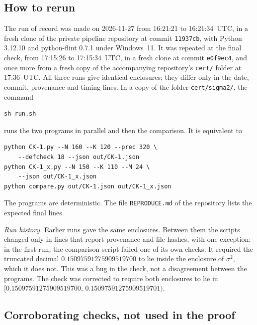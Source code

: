 \documentclass[11pt]{amsart}
\theoremstyle{definition}
\theoremstyle{remark}
\numberwithin{equation}{section}
\begin{document}
\subsection{How to rerun}

The run of record was made on 2026-11-27 from 16:21:21 to 16:21:34~UTC, in a fresh clone of the private pipeline repository at commit \texttt{11937cb}, with Python 3.12.10 and python-flint 0.7.1 under Windows~11. It was repeated at the final check, from 17:15:26 to 17:15:34~UTC, in a fresh clone at commit \texttt{e0f9ec4}, and once more from a fresh copy of the accompanying repository's \nolinkurl{cert/} folder at 17:36~UTC. All three runs give identical enclosures; they differ only in the date, commit, provenance and timing lines. In a copy of the folder \nolinkurl{cert/sigma2/}, the command
\begin{verbatim}
sh run.sh
\end{verbatim}
runs the two programs in parallel and then the comparison. It is equivalent to
\begin{verbatim}
python CK-1.py --N 160 --K 120 --prec 320 \
    --defcheck 18 --json out/CK-1.json
python CK-1_x.py --N 150 --K 110 --M 24 \
    --json out/CK-1_x.json
python compare.py out/CK-1.json out/CK-1_x.json
\end{verbatim}
The programs are deterministic. The file \nolinkurl{REPRODUCE.md} of the repository lists the expected final lines.

\emph{Run history.} Earlier runs gave the same enclosures. Between them the scripts changed only in lines that report provenance and file hashes, with one exception: in the first run, the comparison script failed one of its own checks. It required the truncated decimal \(0.15097591275909519700\) to lie inside the enclosure of \(\sigma^2\), which it does not. This was a bug in the check, not a disagreement between the programs. The check was corrected to require both enclosures to lie in \([0.15097591275909519700,\,0.15097591275909519701)\).

\subsection{Corroborating checks, not used in the proof}
\end{document}
